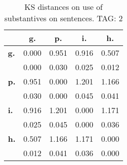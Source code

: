 \begin{table}[h!]
\begin{center}
\begin{tabular}{| l || c | c | c | c |}\hline
 & {\bf g.} & {\bf p.} & {\bf i.} & {\bf h.} \\\hline\hline
{\bf g.} & 0.000 & 0.951 & 0.916 & 0.507 \\
{\bf } & 0.000 & 0.030 & 0.025 & 0.012 \\\hline
{\bf p.} & 0.951 & 0.000 & 1.201 & 1.166 \\
{\bf } & 0.030 & 0.000 & 0.045 & 0.041 \\\hline
{\bf i.} & 0.916 & 1.201 & 0.000 & 1.171 \\
{\bf } & 0.025 & 0.045 & 0.000 & 0.036 \\\hline
{\bf h.} & 0.507 & 1.166 & 1.171 & 0.000 \\
{\bf } & 0.012 & 0.041 & 0.036 & 0.000 \\\hline
\end{tabular}
\caption{KS distances on use of substantives on sentences. TAG: 2}
\end{center}
\end{table}